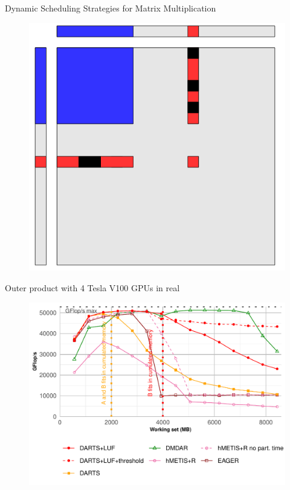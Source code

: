 \documentclass{libs/ufc_format}
\begin{document}
\begin{frame}[noframenumbering]{Dynamic Scheduling Strategies for Matrix Multiplication}
    \begin{figure}
        \centering
        \includegraphics[scale=0.3]{Images/dynamic_outer_example.png}
    \end{figure}
\end{frame}

\begin{frame}[noframenumbering]{Outer product with 4 Tesla V100 GPUs in real}
    \begin{figure}
        \centering
        \includegraphics[scale=0.45]{Images/GF_dynamic_data_aware_no_hfp_gemini-2-ipdps_4GPU.pdf}
    \end{figure}
\end{frame}
\end{document}

